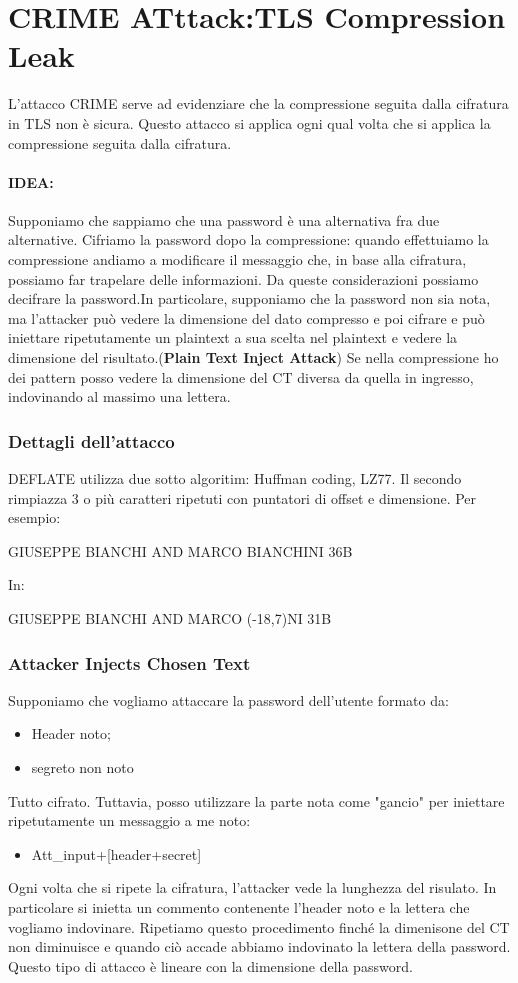 \documentclass{article}
\theoremstyle{remark}
\begin{document}
\section{CRIME ATttack:TLS Compression Leak}
L'attacco CRIME serve ad evidenziare che la compressione seguita dalla cifratura in TLS non è sicura. Questo attacco si applica ogni qual volta che si applica la compressione seguita dalla cifratura.
\paragraph{IDEA:}Supponiamo che sappiamo che una password è una alternativa fra due alternative. Cifriamo la password dopo la compressione: quando effettuiamo la compressione andiamo a modificare il messaggio che, in base alla cifratura, possiamo far trapelare delle informazioni. Da queste considerazioni possiamo decifrare la password.\newline In particolare, supponiamo che la password non sia nota, ma l'attacker può vedere la dimensione del dato compresso e poi cifrare e può iniettare ripetutamente un plaintext a sua scelta nel plaintext e vedere la dimensione del risultato.(\textbf{Plain Text Inject Attack}) Se nella compressione ho dei pattern posso vedere la dimensione del CT diversa da quella in ingresso, indovinando al massimo una lettera.\newline
\subsubsection{Dettagli dell'attacco}
DEFLATE utilizza due sotto algoritim: Huffman coding, LZ77. Il secondo rimpiazza 3 o più caratteri ripetuti con puntatori di offset e dimensione. Per esempio:\begin{center}
	GIUSEPPE BIANCHI AND MARCO BIANCHINI   36B
\end{center}
In:\begin{center}
	GIUSEPPE BIANCHI AND MARCO (-18,7)NI   31B
\end{center}
\subsubsection{Attacker Injects Chosen Text}
Supponiamo che vogliamo attaccare la password dell'utente formato da:\begin{itemize}
	\item Header noto;\item segreto non noto
\end{itemize}
Tutto cifrato. Tuttavia, posso utilizzare la parte nota come "gancio" per iniettare ripetutamente un messaggio a me noto:\begin{itemize}
	\item Att\_input+[header+secret]
\end{itemize}
Ogni volta che si ripete la cifratura, l'attacker vede la lunghezza del risulato. In particolare si inietta un commento contenente l'header noto e la lettera che vogliamo indovinare. Ripetiamo questo procedimento finché la dimenisone del CT non diminuisce e quando ciò accade abbiamo indovinato la lettera della password. Questo tipo di attacco è lineare con la dimensione della password.
\end{document}
